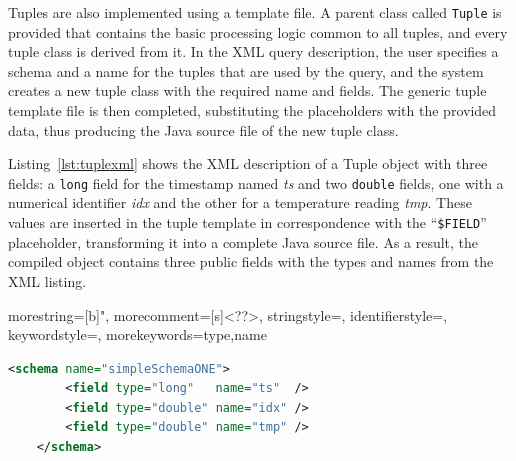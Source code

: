 Tuples are also implemented using a template file. A parent class called \texttt{Tuple} is provided that
contains the basic processing logic common to all tuples, and every tuple class is derived from it.
In the XML query description, the user specifies a schema and a name for the tuples that are used by the
query, and the system creates a new tuple class with the required name and fields. The generic
tuple template file is then completed, substituting the placeholders with the provided data,
thus producing the Java source file of the new tuple class.

Listing~\ref{lst:tuplexml} shows the XML description of a Tuple object with three fields: a
\texttt{long} field for the timestamp named \textit{ts} and two \texttt{double} fields, one with a
numerical identifier \textit{idx} and the other for a temperature reading \textit{tmp}. These values are
inserted in the tuple template in correspondence with the ``\texttt{\$FIELD}'' placeholder, transforming
it into a complete Java source file. As a result, the compiled object contains three public fields with
the types and names from the XML listing.

{
  morestring=[b]",
  morecomment=[s]{<?}{?>},
  stringstyle=\color{BrickRed},
  identifierstyle=\color{NavyBlue},
  keywordstyle=\color{ForestGreen}, 
  morekeywords={type,name}%
}
\begin{lstlisting}[language=XML,label=lst:tuplexml,caption=XML description of a Tuple]
	<schema name="simpleSchemaONE">
	    <field type="long"   name="ts"  />
	    <field type="double" name="idx" />
	    <field type="double" name="tmp" />  
	</schema>
\end{lstlisting}
 

